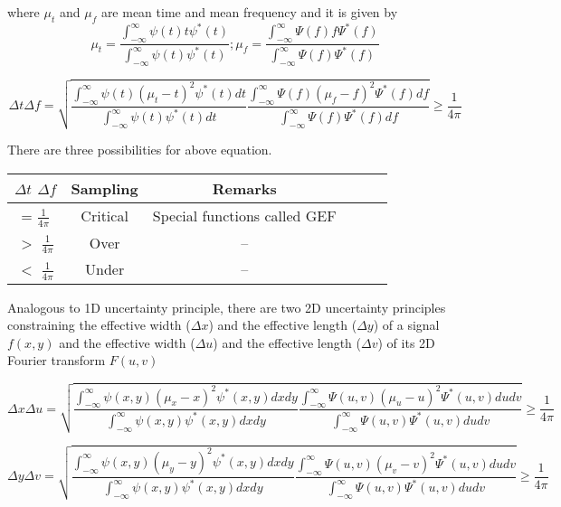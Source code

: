 \documentclass[paper=a4, fontsize=11pt,twoside]{scrartcl}		%
\begin{document}
where $\mu_t$ and $\mu_f$ are mean time and mean frequency and it is given by
\begin{equation*}
\mu_t = \frac{\int_{-\infty}^{\infty}{\psi(t)t\psi ^*(t)}}{\int_{-\infty}^{\infty}{\psi(t)\psi ^*(t)}} ;
\mu_f = \frac{\int_{-\infty}^{\infty}{\Psi(f)f\Psi ^*(f)}}{\int_{-\infty}^{\infty}{\Psi(f)\Psi ^*(f)}}
\end{equation*}


\begin{equation*}
\Delta t\Delta f = \sqrt{\frac{\int_{-\infty}^{\infty}{\psi(t)(\mu_t - t)^2\psi ^*(t)dt}}{\int_{-\infty}^{\infty}{\psi(t)\psi ^*(t)dt}} \frac{\int_{-\infty}^{\infty}{\Psi(f)(\mu_f - f)^2\Psi ^*(f)df}}{\int_{-\infty}^{\infty}{\Psi(f)\Psi ^*(f)df}}} \geq \frac{1}{4\pi}
\end{equation*}

There are three possibilities for above equation.

\begin{tabular}{|c|c|c|ccc|}
  \hline
  \textbf{$\Delta t$  $\Delta f$} & \textbf Sampling & Remarks \\
  \hline
  = $\frac{1}{4\pi}$ & Critical   & Special functions called GEF \\
  \hline
   $>$ $\frac{1}{4\pi}$ & Over   & -- \\
  \hline
  $<$ $\frac{1}{4\pi}$ & Under   & -- \\
  \hline
\end{tabular}

Analogous to 1D uncertainty principle, there are two 2D uncertainty principles constraining the effective width ($\Delta x$) and the effective length ($\Delta y$) of a signal $f(x,y)$ and the effective width ($\Delta u$) and the effective length ($\Delta v$) of its 2D Fourier transform $F(u,v)$


\begin{equation*}
\Delta x\Delta u = \sqrt{\frac{\int_{-\infty}^{\infty}{\psi(x,y)(\mu_x - x)^2\psi ^*(x,y)dxdy}}{\int_{-\infty}^{\infty}{\psi(x,y)\psi ^*(x,y)dxdy}} \frac{\int_{-\infty}^{\infty}{\Psi(u,v)(\mu_u - u)^2\Psi ^*(u,v)dudv}}{\int_{-\infty}^{\infty}{\Psi(u,v)\Psi ^*(u,v)dudv}}} \geq \frac{1}{4\pi}
\end{equation*}


\begin{equation*}
\Delta y\Delta v = \sqrt{\frac{\int_{-\infty}^{\infty}{\psi(x,y)(\mu_y - y)^2\psi ^*(x,y)dxdy}}{\int_{-\infty}^{\infty}{\psi(x,y)\psi ^*(x,y)dxdy}} \frac{\int_{-\infty}^{\infty}{\Psi(u,v)(\mu_v - v)^2\Psi ^*(u,v)dudv}}{\int_{-\infty}^{\infty}{\Psi(u,v)\Psi ^*(u,v)dudv}}} \geq \frac{1}{4\pi}
\end{equation*}
\end{document}

